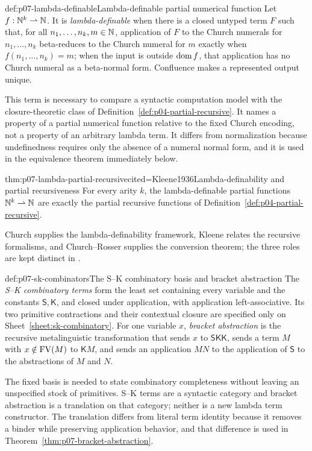 \begin{hbdefinition}{def:p07-lambda-definable}{Lambda-definable partial numerical function}
Let \(f:\mathbb{N}^k\rightharpoonup\mathbb{N}\).  It is \emph{lambda-definable} when there is
a closed untyped term \(F\) such that, for all \(n_1,\ldots,n_k,m\in\mathbb{N}\),
application of \(F\) to the Church numerals for \(n_1,\ldots,n_k\) beta-reduces
to the Church numeral for \(m\) exactly when
\(f(n_1,\ldots,n_k)=m\); when the input is outside \(\operatorname{dom} f\), that application
has no Church numeral as a beta-normal form.  Confluence makes a represented
output unique.

This term is necessary to compare a syntactic computation model with the
closure-theoretic class of Definition~\ref{def:p04-partial-recursive}.  It
names a property of a partial numerical function relative to the fixed Church
encoding, not a property of an arbitrary lambda term.  It differs from
normalization because undefinedness requires only the absence of a numeral
normal form, and it is used in the equivalence theorem immediately below.
\end{hbdefinition}

\begin{hbtheorem}{thm:p07-lambda-partial-recursive}{cited=Kleene1936}{Lambda-definability and partial recursiveness}
For every arity \(k\), the lambda-definable partial functions
\(\mathbb{N}^k\rightharpoonup\mathbb{N}\) are exactly the partial recursive functions of
Definition~\ref{def:p04-partial-recursive}.
\end{hbtheorem}

Church supplies the lambda-definability framework, Kleene relates the
recursive formalisms, and Church--Rosser supplies the conversion theorem; the
three roles are kept distinct in
\cite{Church1936,Kleene1936,ChurchRosser1936}.

\begin{hbdefinition}{def:p07-sk-combinators}{The S--K combinatory basis and bracket abstraction}
The \emph{S--K combinatory terms} form the least set containing every variable
and the constants \(\mathsf S,\mathsf K\), and closed under application, with
application left-associative.
Its two primitive contractions and their contextual closure are specified only
on Sheet~\ref{sheet:sk-combinatory}.
For one variable \(x\), \emph{bracket abstraction} is the recursive
metalinguistic transformation that sends \(x\) to
\(\mathsf S\mathsf K\mathsf K\), sends a term \(M\) with
\(x\notin\operatorname{FV}(M)\) to \(\mathsf K M\), and sends an application \(MN\) to the
application of \(\mathsf S\) to the abstractions of \(M\) and \(N\).

The fixed basis is needed to state combinatory completeness without leaving
an unspecified stock of primitives.  S--K terms are a syntactic category and
bracket abstraction is a translation on that category; neither is a new
lambda term constructor.  The translation differs from literal term identity
because it removes a binder while preserving application behavior, and that
difference is used in Theorem~\ref{thm:p07-bracket-abstraction}.
\end{hbdefinition}


